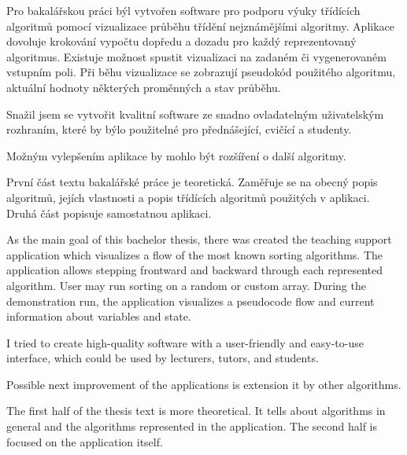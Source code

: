 \documentclass[
  field=inf,
  biblatex,
  language=english,
  glossaries,
  theorems=false,
  sourcecodes=false,
  index
]{kidiplom}
\begin{document}
\begin{kiconclusions}[czech]
Pro bakalářskou práci býl vytvořen software pro podporu výuky třídících algoritmů pomocí vizualizace průběhu třídění nejznámějšími algoritmy. Aplikace dovoluje krokování vypočtu dopředu a dozadu pro každý reprezentovaný algoritmus. Existuje možnost spustit vizualizaci na zadaném či vygenerovaném vstupním poli. Při běhu vizualizace se zobrazují pseudokód použitého algoritmu, aktuální hodnoty některých proměnných a stav průběhu.

Snažil jsem se vytvořit kvalitní software ze snadno ovladatelným uživatelským rozhraním, které by býlo použitelné pro přednášející, cvičící a studenty.

Možným vylepšením aplikace by mohlo být rozšíření o další algoritmy.

První část textu bakalářské práce je teoretická. Zaměřuje se na obecný popis algoritmů, jejích vlastnosti a popis třídících algoritmů použitých v aplikaci. Druhá část popisuje samostatnou aplikaci. 

\end{kiconclusions}

\begin{kiconclusions}[english]
As the main goal of this bachelor thesis, there was created the teaching support application which visualizes a flow of the most known sorting algorithms. The application allows stepping frontward and backward through each represented algorithm. User may run sorting on a random or custom array. During the demonstration run, the application visualizes a pseudocode flow and current information about variables and state.

I tried to create high-quality software with a user-friendly and easy-to-use interface, which could be used by lecturers, tutors, and students.

Possible next improvement of the applications is extension it by other algorithms.

The first half of the thesis text is more theoretical. It tells about algorithms in general and the algorithms represented in the application. The second half is focused on the application itself.
\end{kiconclusions}

\appendix
\end{document}
